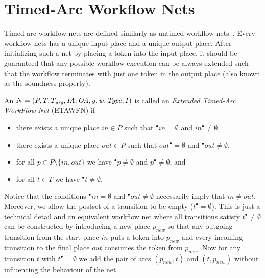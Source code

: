 \section{Timed-Arc Workflow Nets}\label{sec:tawfn}

Timed-arc workflow nets are defined similarly as untimed 
workflow nets~\cite{Aalst97}. Every workflow nets has a unique
input place and a unique output place. After initializing such a 
net by placing a token into the input place, it should be
guaranteed that any possible workflow execution can be always 
extended such that the workflow terminates with just one token
in the output place (also known as the soundness property).


\begin{definition} \label{defetawfn}
An  $N=(P, T, T_{\mathit{urg}}, \mathit{IA},\allowbreak \mathit{OA}, \mathit{g}, \mathit{w}, \mathit{Type}, \mathit{I})$ is called an 
\emph{Extended Timed-Arc WorkFlow Net} (ETAWFN) 
if
\begin{itemize}
\item there exists a unique place $in \in P$ such that $^\bullet in= \emptyset$ and $in^\bullet \neq \emptyset$,
\item there exists a unique place $out \in P$ such that $out^\bullet=\emptyset$ and $^\bullet out \neq \emptyset$,
\item for all $p \in P \setminus \{in,out\}$ we have $^\bullet p \neq \emptyset$ and $p^\bullet \neq \emptyset$, and
\item for all $t \in T$ we have $^\bullet t \neq \emptyset.$
\end{itemize} 
\end{definition}

\begin{remark}
Notice that the conditions $^\bullet in= \emptyset$ and
$^\bullet out \neq \emptyset$ necessarily imply that $in \not= out$.
Moreover, we allow the postset of a transition to be empty 
($t^\bullet=\emptyset$). This is just a technical detail and
an equivalent workflow net where all transitions satisfy
$t^\bullet \not= \emptyset$ can be constructed
by introducing a new place $p_\mathit{new}$ so that any outgoing transition
from the start place $in$ puts a token into $p_\mathit{new}$ and every
incoming transition to the final place $out$  consumes the token
from $p_\mathit{new}$. Now for any transition $t$ with 
$t^\bullet=\emptyset$ we add the pair of arcs $(p_\mathit{new},t)$
and $(t,p_\mathit{new})$ without influencing the behaviour of the net.
\end{remark}


